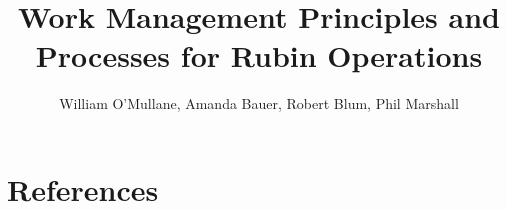 \documentclass[DM,authoryear,toc]{lsstdoc}
\title{Work Management Principles and Processes for Rubin Operations}
\author{%
William O'Mullane,  Amanda Bauer, Robert Blum, Phil Marshall
}
\date{\vcsDate}
\begin{document}
\maketitle



\appendix
\section{References} \label{sec:bib}
\renewcommand{\refname}{} %


%
\printglossaries
\end{document}
